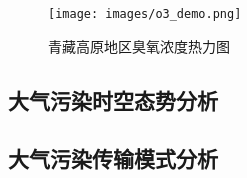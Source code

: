 \documentclass[UTF8]{ctexrep}
\begin{document}
    \begin{figure}[h!]
        \centering
        \texttt{[image: images/o3\_demo.png]}
        \caption{青藏高原地区臭氧浓度热力图}
        \label{fig:o3_tibet}
    \end{figure}

    \subsection{大气污染时空态势分析}

    \subsection{大气污染传输模式分析}
    
\end{document}
